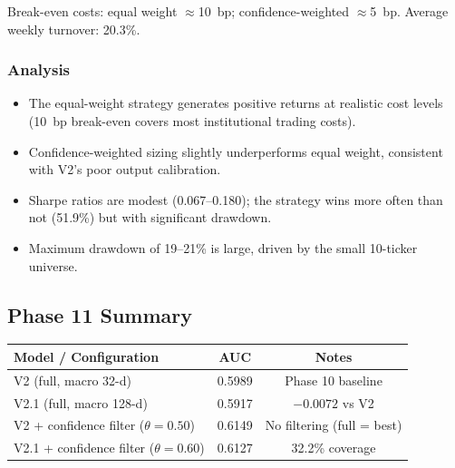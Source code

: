 \documentclass[12pt,a4paper]{article}
\begin{document}
Break-even costs: equal weight $\approx$10~bp; confidence-weighted $\approx$5~bp.
Average weekly turnover: 20.3\%.

\subsubsection{Analysis}
\begin{itemize}
    \item The equal-weight strategy generates positive returns at realistic
          cost levels (10~bp break-even covers most institutional trading costs).
    \item Confidence-weighted sizing slightly underperforms equal weight,
          consistent with V2's poor output calibration.
    \item Sharpe ratios are modest (0.067--0.180); the strategy wins more
          often than not (51.9\%) but with significant drawdown.
    \item Maximum drawdown of 19--21\% is large, driven by the small
          10-ticker universe.
\end{itemize}

\subsection{Phase 11 Summary}

\begin{center}
\begin{tabular}{lcc}
\hline
\textbf{Model / Configuration}            & \textbf{AUC}  & \textbf{Notes} \\
\hline
V2  (full, macro 32-d)                    & 0.5989        & Phase 10 baseline \\
V2.1 (full, macro 128-d)                  & 0.5917        & $-0.0072$ vs V2 \\
V2 + confidence filter ($\theta=0.50$)    & 0.6149        & No filtering (full = best) \\
V2.1 + confidence filter ($\theta=0.60$)  & 0.6127        & 32.2\% coverage \\
\hline
\end{tabular}
\end{center}
\end{document}
